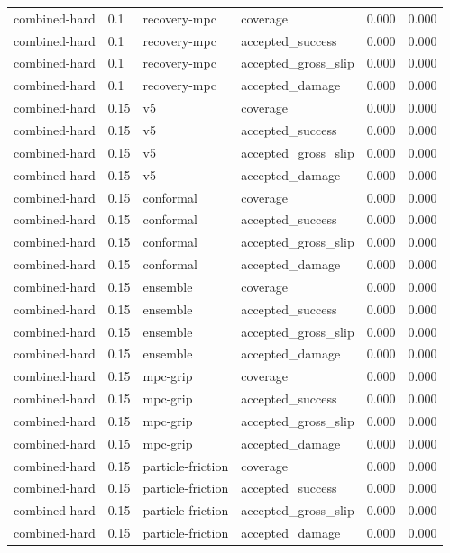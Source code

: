 \documentclass{article}
\begin{document}
\begin{longtable}{@{}ll llrr@{}}
combined-hard & 0.1 & recovery-mpc & coverage & 0.000 & 0.000 \\
combined-hard & 0.1 & recovery-mpc & accepted\_success & 0.000 & 0.000 \\
combined-hard & 0.1 & recovery-mpc & accepted\_gross\_slip & 0.000 & 0.000 \\
combined-hard & 0.1 & recovery-mpc & accepted\_damage & 0.000 & 0.000 \\
combined-hard & 0.15 & v5 & coverage & 0.000 & 0.000 \\
combined-hard & 0.15 & v5 & accepted\_success & 0.000 & 0.000 \\
combined-hard & 0.15 & v5 & accepted\_gross\_slip & 0.000 & 0.000 \\
combined-hard & 0.15 & v5 & accepted\_damage & 0.000 & 0.000 \\
combined-hard & 0.15 & conformal & coverage & 0.000 & 0.000 \\
combined-hard & 0.15 & conformal & accepted\_success & 0.000 & 0.000 \\
combined-hard & 0.15 & conformal & accepted\_gross\_slip & 0.000 & 0.000 \\
combined-hard & 0.15 & conformal & accepted\_damage & 0.000 & 0.000 \\
combined-hard & 0.15 & ensemble & coverage & 0.000 & 0.000 \\
combined-hard & 0.15 & ensemble & accepted\_success & 0.000 & 0.000 \\
combined-hard & 0.15 & ensemble & accepted\_gross\_slip & 0.000 & 0.000 \\
combined-hard & 0.15 & ensemble & accepted\_damage & 0.000 & 0.000 \\
combined-hard & 0.15 & mpc-grip & coverage & 0.000 & 0.000 \\
combined-hard & 0.15 & mpc-grip & accepted\_success & 0.000 & 0.000 \\
combined-hard & 0.15 & mpc-grip & accepted\_gross\_slip & 0.000 & 0.000 \\
combined-hard & 0.15 & mpc-grip & accepted\_damage & 0.000 & 0.000 \\
combined-hard & 0.15 & particle-friction & coverage & 0.000 & 0.000 \\
combined-hard & 0.15 & particle-friction & accepted\_success & 0.000 & 0.000 \\
combined-hard & 0.15 & particle-friction & accepted\_gross\_slip & 0.000 & 0.000 \\
combined-hard & 0.15 & particle-friction & accepted\_damage & 0.000 & 0.000 \\

\end{longtable}
\end{document}
